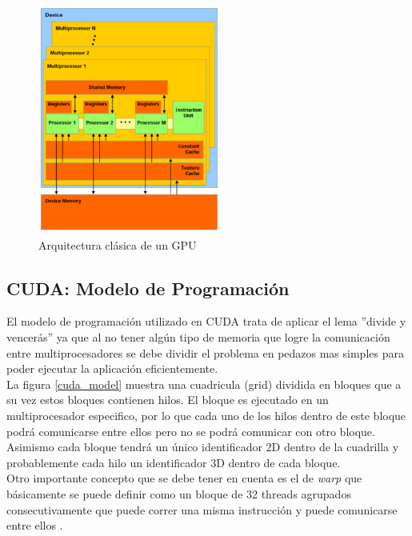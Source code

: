 \documentclass[conference]{IEEEtran}
\begin{document}
\begin{figure}[H]
\centering
\includegraphics[width=6cm]{gpu}
\caption{Arquitectura clásica de un GPU\cite{victor_cuda}}
\label{gpu}
\end{figure}

\subsection{\textbf{CUDA: Modelo de Programación}}
El modelo de programación utilizado en CUDA trata de aplicar el lema ''divide y vencerás''  ya que al no tener algún tipo de memoria que logre la comunicación entre multiprocesadores se debe dividir el problema en pedazos mas simples para poder ejecutar la aplicación eficientemente.\\

La figura \ref{cuda_model} muestra una cuadricula (grid) dividida en bloques que a su vez estos bloques contienen hilos. El bloque es ejecutado en un multiprocesador especifico, por lo que cada uno de los hilos dentro de este bloque podrá comunicarse entre ellos pero no se podrá comunicar con otro bloque. Asimismo cada bloque tendrá un único identificador 2D dentro de la cuadrilla y probablemente cada hilo un identificador 3D dentro de cada bloque.\\

Otro importante concepto que se debe tener en cuenta es el de \textit{warp} que básicamente se puede definir como un bloque de 32 threads agrupados consecutivamente que puede correr una misma instrucción y puede comunicarse entre ellos \cite{warp_cuda}.
\end{document}
